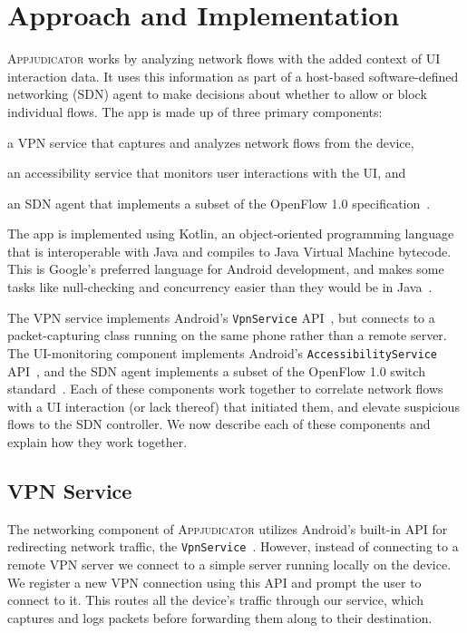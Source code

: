 \section{Approach and Implementation}
\label{sec:implementation}

\textsc{Appjudicator} works by analyzing network flows with the added context of
UI interaction data. It uses this information as part of a host-based
software-defined networking (SDN) agent to make decisions about whether to allow
or block individual flows. The app is made up of three primary components:
\begin{enumerate*}[label=(\arabic*)]
	\item a VPN service that captures and analyzes network flows from the
		device,
	\item an accessibility service that monitors user interactions with the
		UI, and
	\item an SDN agent that implements a subset of the OpenFlow 1.0
		specification~\cite{openflowspec}.
\end{enumerate*}

The app is implemented using Kotlin, an object-oriented programming language
that is interoperable with Java and compiles to Java Virtual Machine bytecode.
This is Google's preferred language for Android development, and makes some
tasks like null-checking and concurrency easier than they would be in
Java~\cite{lardinois2019}.

The VPN service implements Android's \texttt{VpnService}
API~\cite{googledevelopers2020vpn}, but connects to a packet-capturing class
running on the same phone rather than a remote server. The UI-monitoring
component implements Android's \texttt{AccessibilityService}
API~\cite{googledevelopers2020}, and the SDN agent implements a subset of the
OpenFlow 1.0 switch standard~\cite{mckeown2008}. Each of these components work
together to correlate network flows with a UI interaction (or lack thereof) that
initiated them, and elevate suspicious flows to the SDN controller. We now
describe each of these components and explain how they work together.

\subsection{VPN Service}
\label{sec:implementation-vpn-service}

The networking component of \textsc{Appjudicator} utilizes Android's built-in
API for redirecting network traffic, the
\texttt{VpnService}~\cite{googledevelopers2020vpn}. However, instead of
connecting to a remote VPN server we connect to a simple server running locally
on the device. We register a new VPN connection using this API and prompt the
user to connect to it. This routes all the device's traffic through our service,
which captures and logs packets before forwarding them along to their
destination.

